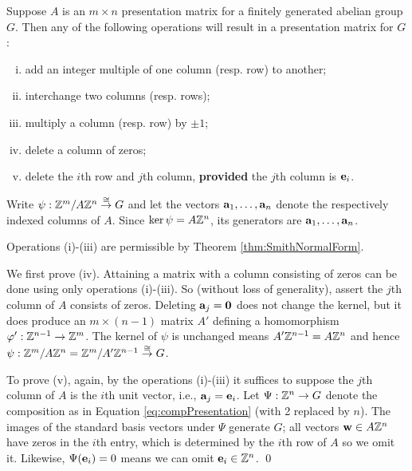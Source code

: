 \documentclass[../algebraNotesMSRI-UP2016.tex]{subfiles}
\begin{document}
\begin{frame}
\begin{prop}\label{prop:allOperations}
Suppose $A$ is an $m\times n$ presentation matrix for a finitely generated abelian group $G$.  Then any of the following operations will result in a presentation matrix for $G$:
\begin{enumerate}[(i)]
\item add an integer multiple of one column (resp. row) to another;
\item interchange two columns (resp. rows);
\item multiply a column (resp. row) by $\pm 1$; 
\item delete a column %
of zeros;
\item delete the $i$th row and $j$th column, \textbf{provided} the $j$th column is $\mathbf e_i$.%
\end{enumerate}
\end{prop}
\end{frame}

\begin{frame}
\bigProof
Write $\psi:\mathbb Z^m/A\mathbb Z^n\overset{\cong}{\to}G$ and let the vectors $\mathbf a_1,\dots,\mathbf a_n$ denote the respectively indexed columns of $A$.  Since $\ker{\psi}=A\mathbb Z^n$, its generators are $\mathbf a_1,\dots, \mathbf a_n$.

\smallGap 
Operations (i)-(iii) are permissible by Theorem \ref{thm:SmithNormalForm}.  

\smallGap
We first prove (iv).  Attaining a matrix with a column consisting of zeros can be done using only operations (i)-(iii).  So  (without loss of generality), assert the $j$th column of $A$ consists of zeros.  Deleting $\mathbf a_j=\mathbf 0$ does not change the kernel, but it does produce an $m\times (n-1)$ matrix $A'$ defining a homomorphism $\varphi':\mathbb Z^{n-1}\to \mathbb Z^m$.  The kernel of $\psi$ is unchanged means $A'\mathbb Z^{n-1}=A\mathbb Z^n$ and hence $\psi: \mathbb Z^m/A\mathbb Z^n=\mathbb Z^m/A'\mathbb Z^{n-1}\overset{\cong}{\to} G$.
\end{frame}

\begin{frame}[c]
To prove (v), again, by the operations (i)-(iii) it suffices to suppose the $j$th column of $A$ is the $i$th unit vector, i.e., $\mathbf a_j=\mathbf e_i$.  Let $\Psi:\mathbb Z^n\to G$ denote the composition as in Equation \eqref{eq:compPresentation} (with 2 replaced by $n$).  The images of the standard basis vectors under $\Psi$ generate $G$; all vectors $\mathbf w\in A\mathbb Z^n$ have zeros in the $i$th entry, which is determined by the $i$th row of $A$ so we omit it.  Likewise, $\Psi({\mathbf e_i})=0$ means we can omit $\mathbf e_i\in \mathbb Z^n$.
\qed
\end{frame}
\end{document}
